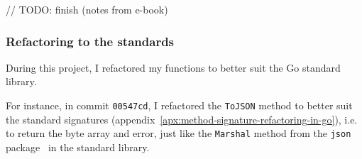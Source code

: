 // TODO: finish (notes from e-book)

\subsubsection{Refactoring to the standards}\label{sec:refactoring-to-the-standards}

During this project,
I refactored my functions to better suit
the Go standard library.

For instance,
in commit \texttt{00547cd},
I refactored the \texttt{ToJSON} method
to better suit the standard signatures
(appendix~\ref{apx:method-signature-refactoring-in-go}),
i.e. to return the byte array and error,
just like the \texttt{Marshal} method
from the \texttt{json} package~\cite{cox_json_2022}
in the standard library.

